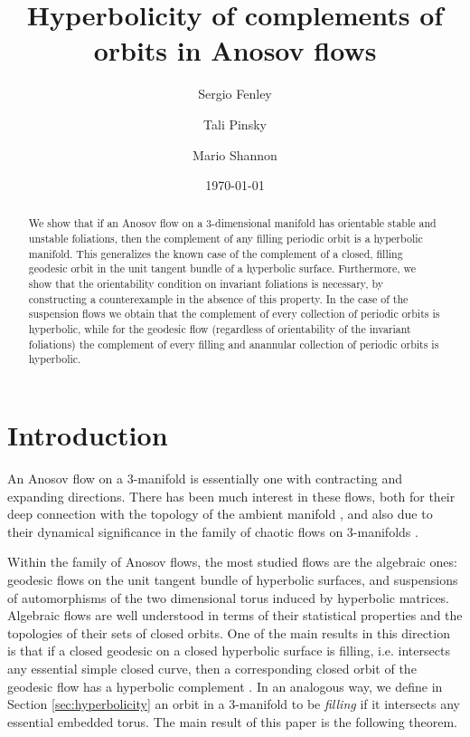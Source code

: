 \documentclass[12pt]{amsart}
\title{Hyperbolicity of complements of orbits in Anosov flows}
\author{Sergio Fenley}
\author{Tali Pinsky}
\author{Mario Shannon}
\date{\today}
\theoremstyle{definition}
\theoremstyle{remark}
\begin{document}
\begin{abstract}
    We show that if an Anosov flow on a 3-dimensional manifold has orientable stable and unstable foliations, then the complement of any filling periodic orbit is a hyperbolic manifold. This generalizes  the known case of the complement of a closed, filling geodesic orbit in the unit tangent bundle of a hyperbolic surface. 
    Furthermore, we show that the orientability condition on invariant foliations is necessary, by constructing a counterexample in the absence of this property. 
    In  the case of the suspension flows we obtain that the complement of every collection of periodic orbits is hyperbolic, while for the geodesic flow (regardless of orientability of the invariant foliations) the complement of every filling and anannular collection of periodic orbits is hyperbolic. 
\end{abstract}

\maketitle

\section{Introduction}
An Anosov flow on a 3-manifold is essentially one with contracting
and expanding directions.
There has been much interest in these flows, both for their deep connection with the topology of the ambient manifold \cite{Anosov1967Geodesic}, and also due to their dynamical significance in the family of chaotic flows on 3-manifolds \cite{BookDynamicsBeyondUniformHyperbolicity2005}.

 
Within the family of Anosov flows, the most studied flows are the algebraic ones: geodesic flows on the unit tangent bundle of hyperbolic surfaces, and suspensions of automorphisms  of the two dimensional torus induced by hyperbolic matrices. Algebraic flows are well understood in terms of their statistical properties  and the topologies of their sets of closed orbits. One of the main results in this direction is that if a closed geodesic  on a closed hyperbolic surface is filling, i.e. intersects any essential simple closed curve, then a corresponding closed orbit of the geodesic flow has a hyperbolic complement \cite{FoulonHasselblatt2013Contact}. 
In an analogous way, we define in Section \ref{sec:hyperbolicity} an orbit in a 3-manifold to be \emph{filling} if it intersects any essential embedded torus.
The main result of this paper is the following theorem.
\end{document}
